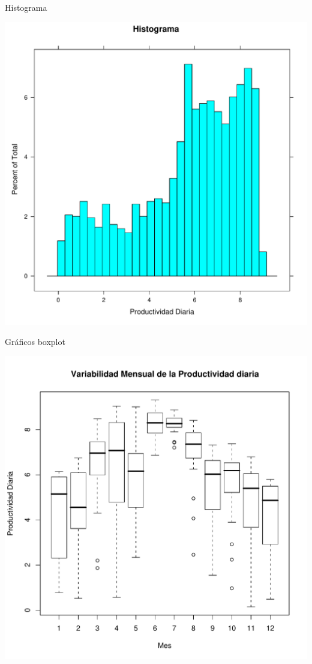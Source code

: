 \documentclass[xcolor={usenames,svgnames,dvipsnames}]{beamer}
\begin{document}
\begin{frame}[label={sec:org20e488b}]{Histograma}
\begin{center}
\includegraphics[width=.9\linewidth]{../figs/Histograma.pdf}
\end{center}
\end{frame}


\begin{frame}[label={sec:org18ed869}]{Gráficos boxplot}
\begin{center}
\includegraphics[width=.9\linewidth]{../figs/GraficoBoxplot.pdf}
\end{center}
\end{frame}
\end{document}
